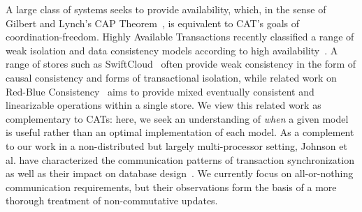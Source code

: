  A large class of systems
seeks to provide availability, which, in the sense of Gilbert and
Lynch's CAP Theorem~\cite{gilbert-cap}, is equivalent to CAT's goals
of coordination-freedom. Highly Available Transactions recently
classified a range of weak isolation and data consistency models
according to high availability~\cite{hat-vldb}. A range of stores such
as SwiftCloud~\cite{swift} often provide weak consistency in the form
of causal consistency and forms of transactional isolation, while
related work on Red-Blue Consistency~\cite{redblue} aims to provide
mixed eventually consistent and linearizable operations within a
single store. We view this related work as complementary to CATs:
here, we seek an understanding of \textit{when} a given model is
useful rather than an optimal implementation of each model. As a
complement to our work in a non-distributed but largely
multi-processor setting, Johnson et al. have characterized the
communication patterns of transaction synchronization as well as their
impact on database design~\cite{shore-communication}. We currently
focus on all-or-nothing communication requirements, but their
observations form the basis of a more thorough treatment of
non-commutative updates.
